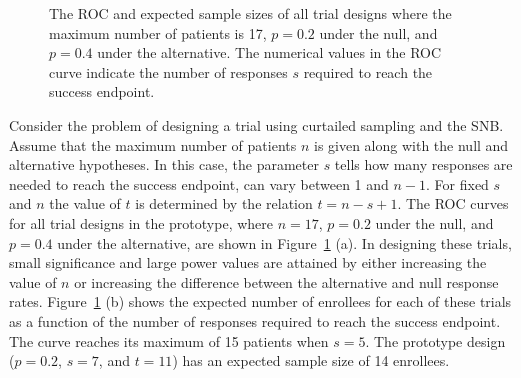 \documentclass[sii]{ipart}
\begin{document}
\begin{figure}
\centering
{}
\hfill
{}
\caption{
The ROC and expected sample sizes of all trial designs where the maximum
number of patients is 17, $p=0.2$ under the null, and $p=0.4$ under
the alternative. The numerical values in the ROC curve indicate the number
of responses $s$ required to reach the success endpoint.
}
\label{fig:all_sample_sizes}
\end{figure}

Consider the problem of designing a trial using curtailed sampling and the SNB. 
Assume that the maximum number of patients $n$ is given along with the null 
and alternative hypotheses. In this case, the parameter $s$ tells how many 
responses are needed to reach the success endpoint, can vary between 1 and 
$n-1$. For fixed $s$ and $n$  the value of $t$ is determined by the relation 
$t=n-s+1$. The ROC curves for all trial designs in the prototype, 
where $n=17$, $p=0.2$ under the null, and $p=0.4$ under the alternative, are 
shown in Figure~\ref{fig:all_sample_sizes} (a). In designing these trials, 
small significance and large power values are attained by either increasing 
the value of $n$ or increasing the difference between the alternative and null 
response rates. Figure~\ref{fig:all_sample_sizes} (b) shows the expected 
number of enrollees for each of these trials as a function of the number of 
responses required to reach the success endpoint.
The curve reaches its maximum of 15 patients when $s=5$. The prototype 
design ($p=0.2$, $s=7$, and $t=11$) has an expected sample size of 14 enrollees.
\end{document}
